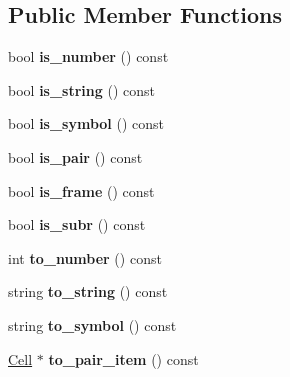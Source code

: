 \subsection*{Public Member Functions}
\begin{DoxyCompactItemize}
\item 
\hypertarget{classCell_a3fc98c5b17b5136698f0d6cc5098d0b1}{bool {\bfseries is\-\_\-number} () const }\label{classCell_a3fc98c5b17b5136698f0d6cc5098d0b1}

\item 
\hypertarget{classCell_a2fa7c6bc8f1aaeea708987a458ee757d}{bool {\bfseries is\-\_\-string} () const }\label{classCell_a2fa7c6bc8f1aaeea708987a458ee757d}

\item 
\hypertarget{classCell_af65cb6ebca6eb0cdae92b94c6c9170eb}{bool {\bfseries is\-\_\-symbol} () const }\label{classCell_af65cb6ebca6eb0cdae92b94c6c9170eb}

\item 
\hypertarget{classCell_ad35f994b709c6f2d39c28d37ea531b5e}{bool {\bfseries is\-\_\-pair} () const }\label{classCell_ad35f994b709c6f2d39c28d37ea531b5e}

\item 
\hypertarget{classCell_aec416c3fd3e42f3f1561f0e4925ef079}{bool {\bfseries is\-\_\-frame} () const }\label{classCell_aec416c3fd3e42f3f1561f0e4925ef079}

\item 
\hypertarget{classCell_ac7e168b8aadf2f45d70edaa07cce1bcf}{bool {\bfseries is\-\_\-subr} () const }\label{classCell_ac7e168b8aadf2f45d70edaa07cce1bcf}

\item 
\hypertarget{classCell_a5feb82baf94f9ea40ab379ff40252057}{int {\bfseries to\-\_\-number} () const }\label{classCell_a5feb82baf94f9ea40ab379ff40252057}

\item 
\hypertarget{classCell_a07fffa139d78f90330cff5d2dec873a0}{string {\bfseries to\-\_\-string} () const }\label{classCell_a07fffa139d78f90330cff5d2dec873a0}

\item 
\hypertarget{classCell_a2b0c83446d5395274acd34bb1d749898}{string {\bfseries to\-\_\-symbol} () const }\label{classCell_a2b0c83446d5395274acd34bb1d749898}

\item 
\hypertarget{classCell_a28333096120ab2ee55f6b5349be1df3e}{\hyperlink{classCell}{Cell} $\ast$ {\bfseries to\-\_\-pair\-\_\-item} () const }\label{classCell_a28333096120ab2ee55f6b5349be1df3e}


\end{DoxyCompactItemize}
